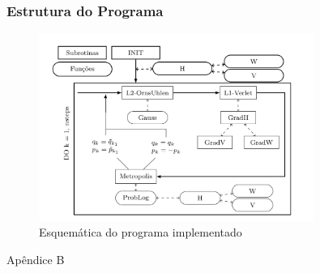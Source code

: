 \begin{frame}
	\frametitle{Estrutura do Programa}
	\begin{figure}
		\centering
		\includegraphics[width=0.8\textwidth]{./media/Results/Esquematics}	
		\caption{Esquemática do programa implementado}
	\end{figure}
\end{frame}


{
\begin{frame}
	\begin{center}
		\huge{Apêndice B}
	\end{center}
\end{frame}
}

